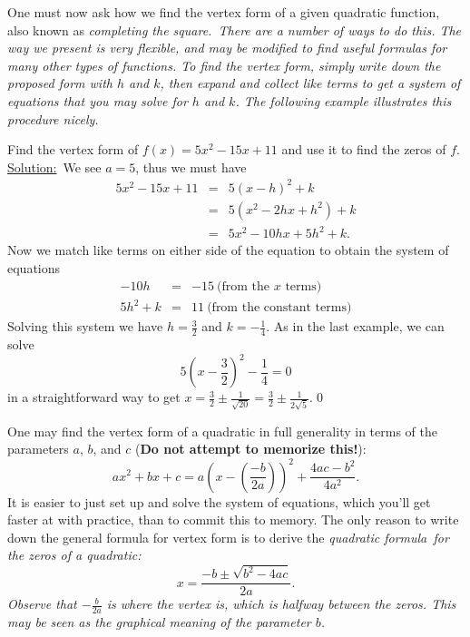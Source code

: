 \par

One must now ask how we find the vertex form of a given quadratic function, also known as \it{completing the square}.\ \normalfont There are a number of ways to do this. The way we present is very flexible, and may be modified to find useful formulas for many other types of functions. To find the vertex form, simply write down the proposed form with $h$ and $k$, then expand and collect like terms to get a system of equations that you may solve for $h$ and $k$. The following example illustrates this procedure nicely.

\par 

\begin{eg} Find the vertex form of $f(x) = 5x^2-15x+11$ and use it to find the zeros of $f$.\\
\underline{Solution:}\ \normalfont We see $a=5$, thus we must have
\begin{eqnarray*}
5x^2-15x+11 & = & 5(x-h)^2+k\\
\ & = & 5(x^2-2hx+h^2) + k\\
\ & = & 5x^2 - 10hx + 5h^2 + k.
\end{eqnarray*}
Now we match like terms on either side of the equation to obtain the system of equations
\begin{eqnarray*}
-10h & = & -15\ \mbox{(from the $x$ terms)}\\
5h^2 + k& = & 11\ \mbox{(from the constant terms)}
\end{eqnarray*}
Solving this system we have $h = \frac{3}{2}$ and $k = -\frac{1}{4}$. As in the last example, we can solve
\[
5\left(x-\frac{3}{2}\right)^2 - \frac{1}{4} = 0
\]
in a straightforward way to get $x = \frac{3}{2}\pm\frac{1}{\sqrt{20}} = \frac{3}{2}\pm\frac{1}{2\sqrt{5}}$.\qed \end{eg}

One may find the vertex form of a quadratic in full generality in terms of the parameters $a$, $b$, and $c$ ({\bf Do not attempt to memorize this!}):
\[
ax^2+bx+c = a\left(x-\left(\frac{-b}{2a}\right)\right)^2 + \frac{4ac-b^2}{4a^2}.
\]
It is easier to just set up and solve the system of equations, which you'll get faster at with practice, than to commit this to memory. The only reason to write down the general formula for vertex form is to derive the \it{quadratic formula}\ \normalfont for the zeros of a quadratic:
\[
x = \frac{-b\pm\sqrt{b^2-4ac}}{2a}.
\]
Observe that $-\frac{b}{2a}$ is where the vertex is, which is halfway between the zeros. This may be seen as the graphical meaning of the parameter $b$.

